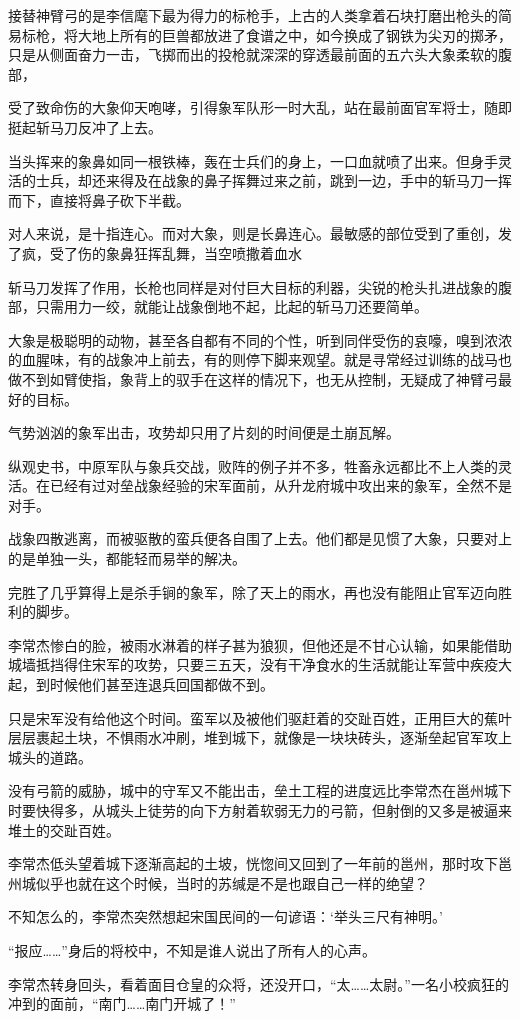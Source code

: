 接替神臂弓的是李信麾下最为得力的标枪手，上古的人类拿着石块打磨出枪头的简易标枪，将大地上所有的巨兽都放进了食谱之中，如今换成了钢铁为尖刃的掷矛，只是从侧面奋力一击，飞掷而出的投枪就深深的穿透最前面的五六头大象柔软的腹部，

受了致命伤的大象仰天咆哮，引得象军队形一时大乱，站在最前面官军将士，随即挺起斩马刀反冲了上去。

当头挥来的象鼻如同一根铁棒，轰在士兵们的身上，一口血就喷了出来。但身手灵活的士兵，却还来得及在战象的鼻子挥舞过来之前，跳到一边，手中的斩马刀一挥而下，直接将鼻子砍下半截。

对人来说，是十指连心。而对大象，则是长鼻连心。最敏感的部位受到了重创，发了疯，受了伤的象鼻狂挥乱舞，当空喷撒着血水

斩马刀发挥了作用，长枪也同样是对付巨大目标的利器，尖锐的枪头扎进战象的腹部，只需用力一绞，就能让战象倒地不起，比起的斩马刀还要简单。

大象是极聪明的动物，甚至各自都有不同的个性，听到同伴受伤的哀嚎，嗅到浓浓的血腥味，有的战象冲上前去，有的则停下脚来观望。就是寻常经过训练的战马也做不到如臂使指，象背上的驭手在这样的情况下，也无从控制，无疑成了神臂弓最好的目标。

气势汹汹的象军出击，攻势却只用了片刻的时间便是土崩瓦解。

纵观史书，中原军队与象兵交战，败阵的例子并不多，牲畜永远都比不上人类的灵活。在已经有过对垒战象经验的宋军面前，从升龙府城中攻出来的象军，全然不是对手。

战象四散逃离，而被驱散的蛮兵便各自围了上去。他们都是见惯了大象，只要对上的是单独一头，都能轻而易举的解决。

完胜了几乎算得上是杀手锏的象军，除了天上的雨水，再也没有能阻止官军迈向胜利的脚步。

李常杰惨白的脸，被雨水淋着的样子甚为狼狈，但他还是不甘心认输，如果能借助城墙抵挡得住宋军的攻势，只要三五天，没有干净食水的生活就能让军营中疾疫大起，到时候他们甚至连退兵回国都做不到。

只是宋军没有给他这个时间。蛮军以及被他们驱赶着的交趾百姓，正用巨大的蕉叶层层裹起土块，不惧雨水冲刷，堆到城下，就像是一块块砖头，逐渐垒起官军攻上城头的道路。

没有弓箭的威胁，城中的守军又不能出击，垒土工程的进度远比李常杰在邕州城下时要快得多，从城头上徒劳的向下方射着软弱无力的弓箭，但射倒的又多是被逼来堆土的交趾百姓。

李常杰低头望着城下逐渐高起的土坡，恍惚间又回到了一年前的邕州，那时攻下邕州城似乎也就在这个时候，当时的苏缄是不是也跟自己一样的绝望？

不知怎么的，李常杰突然想起宋国民间的一句谚语：‘举头三尺有神明。’

“报应……”身后的将校中，不知是谁人说出了所有人的心声。

李常杰转身回头，看着面目仓皇的众将，还没开口，“太……太尉。”一名小校疯狂的冲到的面前，“南门……南门开城了！”

